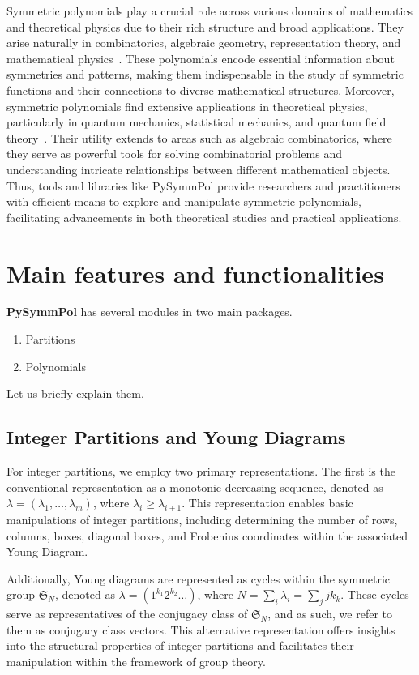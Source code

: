 \documentclass[a4paper,10pt]{amsart}
\begin{document}
Symmetric polynomials play a crucial role across various domains of
mathematics and theoretical physics due to their rich structure and
broad applications. They arise naturally in combinatorics, algebraic
geometry, representation theory, and mathematical
physics~\cite{Macdonald:1998, Fulton:2004}. These polynomials encode
essential information about symmetries and patterns, making them
indispensable in the study of symmetric functions and their
connections to diverse mathematical structures. Moreover, symmetric
polynomials find extensive applications in theoretical physics,
particularly in quantum mechanics, statistical mechanics, and quantum
field theory~\cite{Babelon:2003, Korepin:1993, Marino:2005,
  Wheeler:2010}.  Their utility extends to areas such as algebraic
combinatorics, where they serve as powerful tools for solving
combinatorial problems and understanding intricate relationships
between different mathematical objects. Thus, tools and libraries like
PySymmPol provide researchers and practitioners with efficient means
to explore and manipulate symmetric polynomials, facilitating
advancements in both theoretical studies and practical applications.
 

\section{Main features and functionalities}

\textbf{PySymmPol} has several modules in two main packages. 
\begin{enumerate}
\item Partitions
\item Polynomials
\end{enumerate}
Let us briefly explain them. 

\subsection{Integer Partitions and Young Diagrams}

For integer partitions, we employ two primary representations. The
first is the conventional representation as a monotonic decreasing
sequence, denoted as $\lambda = (\lambda_1, \dots, \lambda_m)$, where
$\lambda_i \geq \lambda_{i+1}$. This representation enables basic
manipulations of integer partitions, including determining the number
of rows, columns, boxes, diagonal boxes, and Frobenius coordinates
within the associated Young Diagram.

Additionally, Young diagrams are represented as cycles within the
symmetric group $\mathfrak{S}_N$, denoted as $\lambda = (1^{k_1}
2^{k_2} \dots)$, where $N = \sum_i\lambda_i = \sum_j j k_k$. These
cycles serve as representatives of the conjugacy class of
$\mathfrak{S}_N$, and as such, we refer to them as conjugacy class
vectors. This alternative representation offers insights into the
structural properties of integer partitions and facilitates their
manipulation within the framework of group theory.
\end{document}
